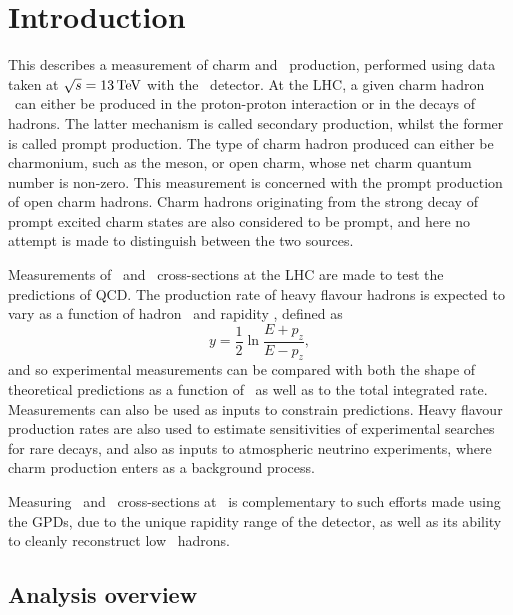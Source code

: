 \chapter{Introduction}
\label{chap:prod:introduction}

This  describes a measurement of charm and \ccbar\ 
production, performed using data taken at $\sqrts = \SI{13}{\TeV}$ with the 
\lhcb\ detector.
At the \ac{LHC}, a given charm hadron \PHc\ can either be produced in the 
proton-proton interaction or in the decays of \PB hadrons.
The latter mechanism is called secondary production, whilst the former is 
called prompt production.
The type of charm hadron produced can either be charmonium, such as the \PJpsi 
meson, or open charm, whose net charm quantum number is non-zero.
This measurement is concerned with the prompt production of open charm hadrons.
Charm hadrons originating from the strong decay of prompt excited charm states 
are also considered to be prompt, and here no attempt is made to distinguish 
between the two sources.

Measurements of \ccbar\ and \bbbar\ cross-sections at the \ac{LHC} are made to 
test the predictions of \ac{QCD}.
The production rate of heavy flavour hadrons is expected to vary as a function 
of hadron \pT\ and rapidity \rapidity, defined as
\begin{equation}
  y = \frac{1}{2}\ln{\frac{E + p_{z}}{E - p_{z}}},
  \label{eqn:prod:introduction:rapidity}
\end{equation}
and so experimental measurements can be compared with both the shape of 
theoretical predictions as a function of \pTy\ as well as to the total 
integrated rate.
Measurements can also be used as inputs to constrain predictions.
Heavy flavour production rates are also used to estimate sensitivities of 
experimental searches for rare decays, and also as inputs to atmospheric 
neutrino experiments, where charm production enters as a background process.

Measuring \ccbar\ and \bbbar\ cross-sections at \lhcb\ is complementary to such 
efforts made using the \acp{GPD}, due to the unique rapidity range of the 
detector, as well as its ability to cleanly reconstruct low \pT\ hadrons.

\section{Analysis overview}
\label{chap:prod:introduction:analysis_overview}

